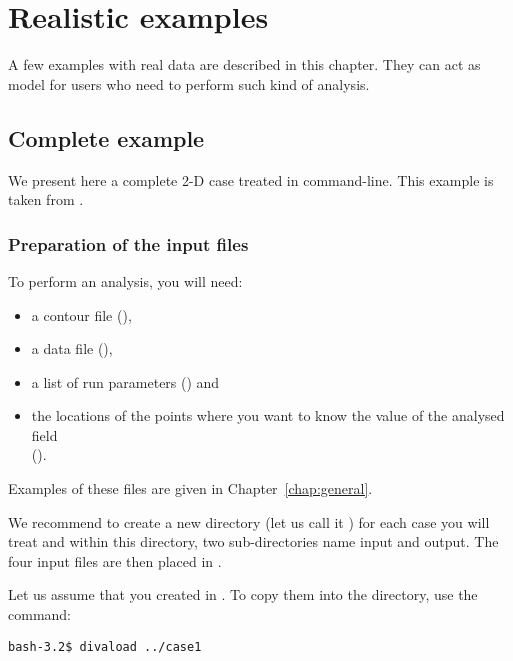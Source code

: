 \chapter{Realistic examples\label{chap:examples}}

A few examples with real data are described in this chapter. They can act as model for users who need to perform such kind of analysis. 

\minitoc

\newpage

\section{Complete example\label{sec:medseaex}}

We present here a complete 2-D case treated in command-line. This example is taken from \citet{TROUPIN12}.

\subsection{Preparation of the input files\label{prep}}

To perform an analysis, you will need:
\begin{itemize}
\item a contour file (),
\item a data file (), 
\item a list of run parameters () and 
\item the locations of the points where you want to know the value of the analysed field\\ 
	  ().
\end{itemize}
Examples of these files are given in Chapter~\ref{chap:general}.

We recommend to create a new directory (let us call it ) for each case you will treat and within this directory, two sub-directories name input and output. The four input files are then placed in . 

Let us assume that you created  in . To copy them into the  directory, use the command: 

\vspace{.25cm}
\begin{lstlisting}[style=Bash]
bash-3.2$ divaload ../case1
\end{lstlisting}

